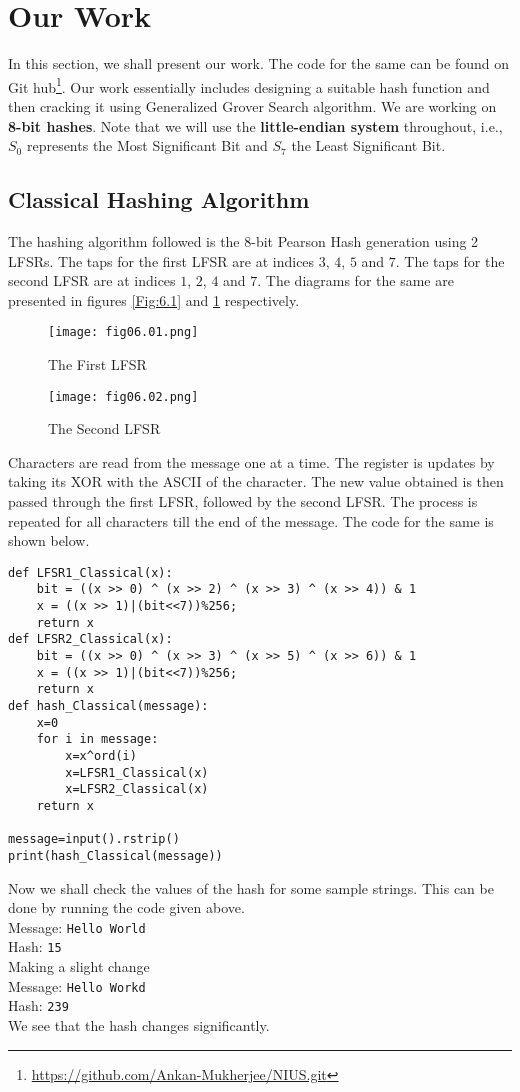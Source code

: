 \section{Our Work}
In this section, we shall present our work. The code for the same can be found on Git hub\footnote{\url{https://github.com/Ankan-Mukherjee/NIUS.git}}. Our work essentially includes designing a suitable hash function and then cracking it using Generalized Grover Search algorithm. 
We are working on \textbf{8-bit hashes}. Note that we will use the \textbf{little-endian system} throughout, i.e., $S_0$ represents the Most Significant Bit and $S_7$ the Least Significant Bit.
\subsection{Classical Hashing Algorithm}
The hashing algorithm followed is the 8-bit Pearson Hash generation using 2 LFSRs. The taps for the first LFSR are at indices $3$, $4$, $5$ and $7$. The taps for the second LFSR are at indices $1$, $2$, $4$ and $7$. The diagrams for the same are presented in figures \ref{Fig:6.1} and \ref{Fig:6.2} respectively.
\begin{figure}[!htb]
   \begin{minipage}{\textwidth}
     \centering
     \texttt{[image: fig06.01.png]}
     \caption{The First LFSR}
     \label{Fig:6.1}
   \end{minipage}
   \begin{minipage}{\textwidth}
     \centering
     \texttt{[image: fig06.02.png]}
     \caption{The Second LFSR}
     \label{Fig:6.2}
   \end{minipage}
\end{figure}
Characters are read from the message one at a time. The register is updates by taking its XOR with the ASCII of the character. The new value obtained is then passed through the first LFSR, followed by the second LFSR. The process is repeated for all characters till the end of the message. The code for the same is shown below.
\begin{lstlisting}
def LFSR1_Classical(x):
    bit = ((x >> 0) ^ (x >> 2) ^ (x >> 3) ^ (x >> 4)) & 1
    x = ((x >> 1)|(bit<<7))%256;
    return x
def LFSR2_Classical(x):
    bit = ((x >> 0) ^ (x >> 3) ^ (x >> 5) ^ (x >> 6)) & 1
    x = ((x >> 1)|(bit<<7))%256;
    return x
def hash_Classical(message):
    x=0
    for i in message:
        x=x^ord(i)
        x=LFSR1_Classical(x)
        x=LFSR2_Classical(x)
    return x

message=input().rstrip()
print(hash_Classical(message))
\end{lstlisting}
Now we shall check the values of the hash for some sample strings. This can be done by running the code given above.\\
Message: \verb|Hello World|\\
Hash: \verb|15|\\
Making a slight change\\
Message: \verb|Hello Workd|\\
Hash: \verb|239|\\
We see that the hash changes significantly.

